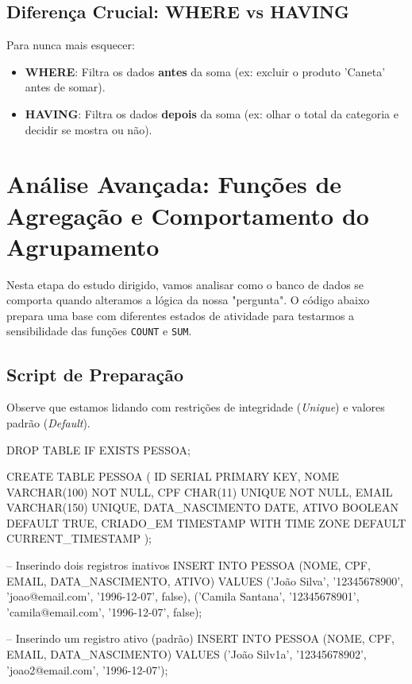 \documentclass[12pt,a4paper,openright]{book}
\begin{document}
\subsection{Diferença Crucial: WHERE vs HAVING}

Para nunca mais esquecer:
\begin{itemize}
    \item \textbf{WHERE}: Filtra os dados \textbf{antes} da soma (ex: excluir o produto 'Caneta' antes de somar).
    \item \textbf{HAVING}: Filtra os dados \textbf{depois} da soma (ex: olhar o total da categoria e decidir se mostra ou não).
\end{itemize}

\section{Análise Avançada: Funções de Agregação e Comportamento do Agrupamento}

Nesta etapa do estudo dirigido, vamos analisar como o banco de dados se comporta quando alteramos a lógica da nossa "pergunta". O código abaixo prepara uma base com diferentes estados de atividade para testarmos a sensibilidade das funções \texttt{COUNT} e \texttt{SUM}.

\subsection{Script de Preparação}

Observe que estamos lidando com restrições de integridade (\textit{Unique}) e valores padrão (\textit{Default}).

\begin{sqlcode}
DROP TABLE IF EXISTS PESSOA;

CREATE TABLE PESSOA (
    ID SERIAL PRIMARY KEY,
    NOME VARCHAR(100) NOT NULL,
    CPF CHAR(11) UNIQUE NOT NULL,
    EMAIL VARCHAR(150) UNIQUE,
    DATA_NASCIMENTO DATE,
    ATIVO BOOLEAN DEFAULT TRUE,
    CRIADO_EM TIMESTAMP WITH TIME ZONE DEFAULT CURRENT_TIMESTAMP
);

-- Inserindo dois registros inativos
INSERT INTO PESSOA (NOME, CPF, EMAIL, DATA_NASCIMENTO, ATIVO)
VALUES ('João Silva', '12345678900', 'joao@email.com', '1996-12-07', false),
       ('Camila Santana', '12345678901', 'camila@email.com', '1996-12-07', false);

-- Inserindo um registro ativo (padrão)
INSERT INTO PESSOA (NOME, CPF, EMAIL, DATA_NASCIMENTO)
VALUES ('João Silv1a', '12345678902', 'joao2@email.com', '1996-12-07');
\end{sqlcode}
\end{document}

